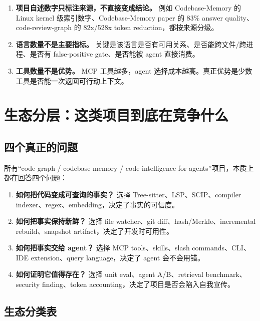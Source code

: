 \documentclass[11pt,a4paper]{article}
\begin{document}
\begin{enumerate}
  \item \textbf{项目自述数字只标注来源，不直接变成结论。} 例如 Codebase-Memory 的 Linux kernel 级索引数字、Codebase-Memory paper 的 83\% answer quality、code-review-graph 的 82x/528x token reduction，都按来源分级。
  \item \textbf{语言数量不是主要指标。} 关键是该语言是否有可用关系、是否能跨文件/跨进程、是否有 false-positive gate、是否能被 agent 直接消费。
  \item \textbf{工具数量不是优势。} MCP 工具越多，agent 选择成本越高。真正优势是少数工具是否能一次返回可行动上下文。
\end{enumerate}

\section{生态分层：这类项目到底在竞争什么}

\subsection{四个真正的问题}

所有“code graph / codebase memory / code intelligence for agents”项目，本质上都在回答四个问题：

\begin{enumerate}
  \item \textbf{如何把代码变成可查询的事实？} 选择 Tree-sitter、LSP、SCIP、compiler indexer、regex、embedding，决定了事实的可信度。
  \item \textbf{如何把事实保持新鲜？} 选择 file watcher、git diff、hash/Merkle、incremental rebuild、snapshot artifact，决定了开发时可用性。
  \item \textbf{如何把事实交给 agent？} 选择 MCP tools、skills、slash commands、CLI、IDE extension、query language，决定了 agent 会不会用错。
  \item \textbf{如何证明它值得存在？} 选择 unit eval、agent A/B、retrieval benchmark、security finding、token accounting，决定了项目是否会陷入自我宣传。
\end{enumerate}

\subsection{生态分类表}
\end{document}
